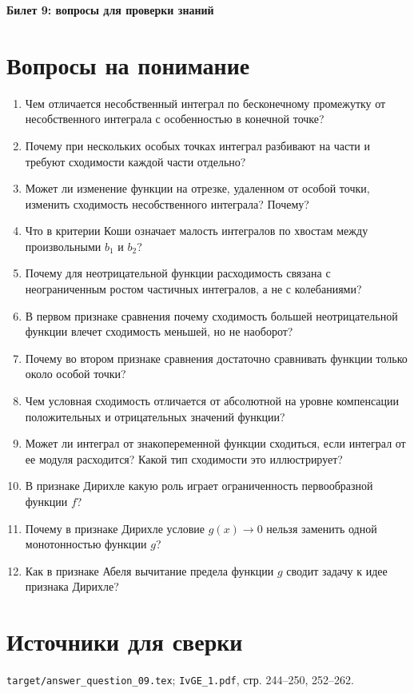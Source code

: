 \documentclass[12pt,a4paper]{article}
\begin{document}
\begin{center}
{\Large\bfseries Билет 9: вопросы для проверки знаний}
\end{center}

\noindent{}

\section*{Вопросы на понимание}

\begin{enumerate}
\item Чем отличается несобственный интеграл по бесконечному промежутку от несобственного интеграла с особенностью в конечной точке?
\item Почему при нескольких особых точках интеграл разбивают на части и требуют сходимости каждой части отдельно?
\item Может ли изменение функции на отрезке, удаленном от особой точки, изменить сходимость несобственного интеграла? Почему?
\item Что в критерии Коши означает малость интегралов по хвостам между произвольными \(b_1\) и \(b_2\)?
\item Почему для неотрицательной функции расходимость связана с неограниченным ростом частичных интегралов, а не с колебаниями?
\item В первом признаке сравнения почему сходимость большей неотрицательной функции влечет сходимость меньшей, но не наоборот?
\item Почему во втором признаке сравнения достаточно сравнивать функции только около особой точки?
\item Чем условная сходимость отличается от абсолютной на уровне компенсации положительных и отрицательных значений функции?
\item Может ли интеграл от знакопеременной функции сходиться, если интеграл от ее модуля расходится? Какой тип сходимости это иллюстрирует?
\item В признаке Дирихле какую роль играет ограниченность первообразной функции \(f\)?
\item Почему в признаке Дирихле условие \(g(x)\to0\) нельзя заменить одной монотонностью функции \(g\)?
\item Как в признаке Абеля вычитание предела функции \(g\) сводит задачу к идее признака Дирихле?
\end{enumerate}

\section*{Источники для сверки}

\texttt{target/answer\_question\_09.tex};
\texttt{IvGE\_1.pdf}, стр. 244--250, 252--262.
\end{document}
